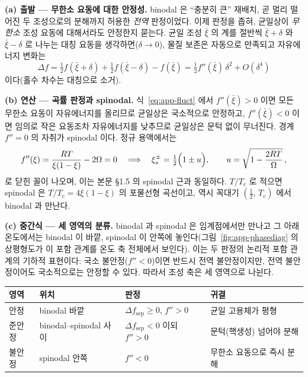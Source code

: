 \documentclass[11pt,a4paper]{article}
\begin{document}
\textbf{(a) 출발 --- 무한소 요동에 대한 안정성.} binodal 은 ``충분히 큰'' 재배치, 곧 멀리 떨어진 두
조성으로의 분해까지 허용한 \emph{전역} 판정이었다. 이제 판정을 좁혀, 균일상이 \emph{무한소} 조성
요동에 대해서라도 안정한지 묻는다. 균일 조성 $\bar\xi$ 의 계를 절반씩 $\bar\xi+\delta$ 와
$\bar\xi-\delta$ 로 나누는 대칭 요동을 생각하면($\delta\to0$), 물질 보존은 자동으로 만족되고
자유에너지 변화는
\begin{equation}
\Delta f=\tfrac12 f(\bar\xi+\delta)+\tfrac12 f(\bar\xi-\delta)-f(\bar\xi)
=\tfrac12 f''(\bar\xi)\,\delta^2+O(\delta^4)
\label{eq:app-fluct}
\end{equation}
이다(홀수 차수는 대칭으로 소거).

\textbf{(b) 연산 --- 곡률 판정과 spinodal.} 식~\eqref{eq:app-fluct} 에서 $f''(\bar\xi)>0$ 이면 모든
무한소 요동이 자유에너지를 올리므로 균일상은 국소적으로 안정하고, $f''(\bar\xi)<0$ 이면 임의로 작은
요동조차 자유에너지를 낮추므로 균일상은 문턱 없이 무너진다. 경계 $f''=0$ 의 자취가 spinodal 이다.
정규 용액에서는
\begin{equation}
f''(\xi)=\frac{RT}{\xi(1-\xi)}-2\Omega=0
\quad\Longrightarrow\quad
\xi_s^\pm=\tfrac12\Bigl(1\pm u\Bigr),\qquad u=\sqrt{1-\frac{2RT}{\Omega}}\,,
\label{eq:app-spinodal}
\end{equation}
로 닫힌 꼴이 나오며, 이는 본문 \S1.5 의 spinodal 근과 동일하다. $T/T_c$ 로 적으면 spinodal 은
$T/T_c=4\xi(1-\xi)$ 의 포물선형 곡선이고, 역시 꼭대기 $(\tfrac12,\,T_c)$ 에서 binodal 과 만난다.

\textbf{(c) 중간식 --- 세 영역의 분류.} binodal 과 spinodal 은 임계점에서만 만나고 그 아래 온도에서는
binodal 이 바깥, spinodal 이 안쪽에 놓인다(그림~\ref{fig:app-phasediag} 의 상평형도가 이 포함 관계를
온도 축 전체에서 보인다). 이는 두 판정의 논리적 포함 관계의 기하적 표현이다:
국소 불안정($f''<0$)이면 반드시 전역 불안정이지만, 전역 불안정이어도 국소적으로는 안정할 수 있다.
따라서 조성 축은 세 영역으로 나뉜다.
\begin{center}
\begin{tabular}{@{}llll@{}}
\toprule
영역 & 위치 & 판정 & 귀결 \\
\midrule
안정 & binodal 바깥 & $\Delta f_\mathrm{sep}\ge0$, $f''>0$ & 균일 고용체가 평형 \\
준안정 & binodal--spinodal 사이 & $\Delta f_\mathrm{sep}<0$ 이되 $f''>0$ & 문턱(핵생성) 넘어야 분해 \\
불안정 & spinodal 안쪽 & $f''<0$ & 무한소 요동으로 즉시 분해 \\
\bottomrule
\end{tabular}
\end{center}
\end{document}
